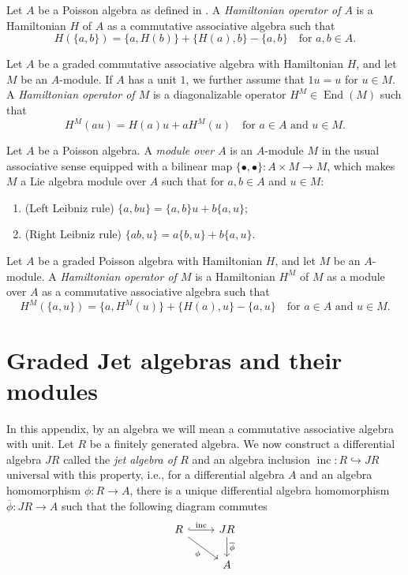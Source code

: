 \documentclass[a4paper, 12pt, reqno]{amsart}
\theoremstyle{remark}
\DeclareMathOperator{\End}{End}
\DeclareMathOperator{\inc}{inc}
\begin{document}
Let $A$ be a Poisson algebra as defined in \cite{caressa_examples_2003}.
A \emph{Hamiltonian operator of $A$} is a Hamiltonian $H$ of $A$ as a commutative associative algebra such that
\begin{equation*}
  H(\{a, b\}) = \{a, H(b)\} + \{H(a), b\} - \{a, b\} \quad \text{for $a, b \in A$}.
\end{equation*}

Let $A$ be a graded commutative associative algebra with Hamiltonian $H$, and let $M$ be an $A$-module.
If $A$ has a unit $1$, we further assume that $1u = u$ for $u \in M$.
A \emph{Hamiltonian operator of $M$} is a diagonalizable operator $H^M \in \End(M)$ such that
\begin{equation*}
  H^M(au) = H(a)u + aH^M(u) \quad \text{for $a \in A$ and $u \in M$}.
\end{equation*}

Let $A$ be a Poisson algebra.
A \emph{module over $A$} is an $A$-module $M$ in the usual associative sense equipped with a bilinear map $\{\bullet, \bullet\}: A \times M \to M$, which makes $M$ a Lie algebra module over $A$ such that for $a, b \in A$ and $u \in M$:
\begin{enumerate}
\item (Left Leibniz rule) $\{a, bu\} = \{a, b\}u + b\{a, u\}$;
\item (Right Leibniz rule) $\{ab, u\} = a\{b, u\} + b\{a, u\}$.
\end{enumerate}

Let $A$ be a graded Poisson algebra with Hamiltonian $H$, and let $M$ be an $A$-module.
A \emph{Hamiltonian operator of $M$} is a Hamiltonian $H^M$ of $M$ as a module over $A$ as a commutative associative algebra such that
\begin{equation*}
  H^M(\{a, u\}) = \{a, H^M(u)\} + \{H(a), u\} - \{a, u\} \quad \text{for $a \in A$ and $u \in M$}.
\end{equation*}

\section{Graded Jet algebras and their modules}
\label{sec:graded-jet-algebras}

In this appendix, by an algebra we will mean a commutative associative algebra with unit.
Let $R$ be a finitely generated algebra.
We now construct a differential algebra $JR$ called the \emph{jet algebra of $R$} and an algebra inclusion $\inc: R \hookrightarrow JR$ universal with this property, i.e., for a differential algebra $A$ and an algebra homomorphism $\phi: R \to A$, there is a unique differential algebra homomorphism $\overline{\phi}: JR \to A$ such that the following diagram commutes
\begin{equation*}
  \begin{tikzcd}
    R \arrow[r, "\inc", hook] \arrow[rd, "\phi"'] & JR \arrow[d, "\overline{\phi}"] \\
    & A
  \end{tikzcd}
\end{equation*}
\end{document}
